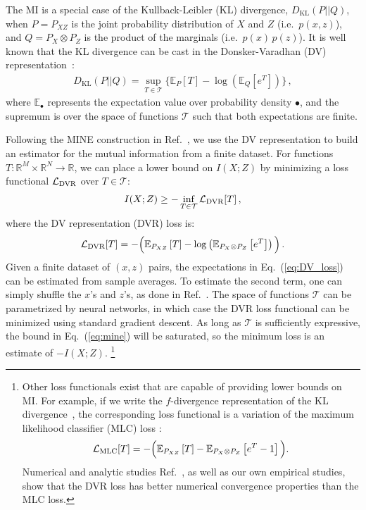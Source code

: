 \documentclass[prl,twocolumn,superscriptaddress,longbibliography,preprintnumbers,floatfix,nofootinbib]{revtex4-1}
\DeclareRobustCommand{\Eq}[1]{Eq.~(\ref{eq:#1})}
\DeclareRobustCommand{\Ref}[1]{Ref.~\cite{#1}}
\begin{document}
The MI is a special case of the Kullback-Leibler (KL) divergence, $D_{\text{KL}}(P||Q)$, when $P=P_{XZ}$ is the joint probability distribution of $X$ and $Z$ (i.e.~$p(x,z)$), and $Q=P_X\otimes P_Z$ is the product of the marginals (i.e.~$p(x)\,p(z)$).
%
It is well known that the KL divergence can be cast in the Donsker-Varadhan (DV) representation~\cite{e5879cd3d84b462abf51f06791e5ba28}:
%
\begin{align}
    D_{\text{KL}}(P||Q) = \sup_{T \in \mathcal{T}}\Big\{\mathbb{E}_P\left[T\right] - \log\left( \mathbb{E}_Q\left[e^T\right]  \right)   \Big\}\,,
\end{align}
%
where $\mathbb{E}_\bullet$ represents the expectation value over probability density $\bullet$, and the supremum is over the space of functions $\mathcal{T}$ such that both expectations are finite.


Following the MINE construction in \Ref{belghazi2018mine}, we use the DV representation to build an estimator for the mutual information from a finite dataset.
%
For functions $T:\mathbb{R}^M \times \mathbb{R}^N \to \mathbb{R}$, we can place a lower bound on $I(X;Z)$ by minimizing a loss functional $\mathcal{L}_{\rm DVR}$ over $T \in \mathcal{T}$:
%
\begin{align}
\label{eq:mine}
    I(X;Z) \geq - \inf_{T\in\mathcal{T}} \mathcal{L}_{\rm DVR}[T]\,,
\end{align}
%
where the DV representation (DVR) loss is:
%
\begin{equation}
    \label{eq:DV_loss}
    \mathcal{L}_{\rm DVR}[T] = -\Big(\mathbb{E}_{P_{XZ}}\left[T\right] - \log\left( \mathbb{E}_{P_X\otimes P_Z}\left[e^T\right]  \right) \Big)\,.
\end{equation}
%
Given a finite dataset of $(x,z)$ pairs, the expectations in \Eq{DV_loss} can be estimated from sample averages.
%
To estimate the second term, one can simply shuffle the $x$'s and $z$'s, as done in \Ref{belghazi2018mine}.
%
The space of functions $\mathcal{T}$ can be parametrized by neural networks, in which case the DVR loss functional can be minimized using standard gradient descent.
%
As long as $\mathcal{T}$ is sufficiently expressive, the bound in \Eq{mine} will be saturated, so the minimum loss is an estimate of $-I(X;Z)$.%
%
\footnote{
%
Other loss functionals exist that are capable of providing lower bounds on MI.
%
For example, if we write the $f$-divergence representation of the KL divergence~\cite{nowozin2016fgan,Nguyen_2010}, the corresponding loss functional is a variation of the maximum likelihood classifier (MLC) loss \cite{DAgnolo:2018cun,DAgnolo:2019vbw,nachman2021e}:
%
\begin{align}
    \mathcal{L}_{\rm MLC}[T] = - \Big(\mathbb{E}_{P_{XZ}}\left[T \right] -  \mathbb{E}_{P_X\otimes P_Z}\left[e^T - 1\right]\Big).
\end{align}
%
Numerical  and analytic studies \Ref{belghazi2018mine, ruderman2012tighter}, as well as our own empirical studies, show that the DVR loss has better numerical convergence properties than the MLC loss.}
\end{document}
